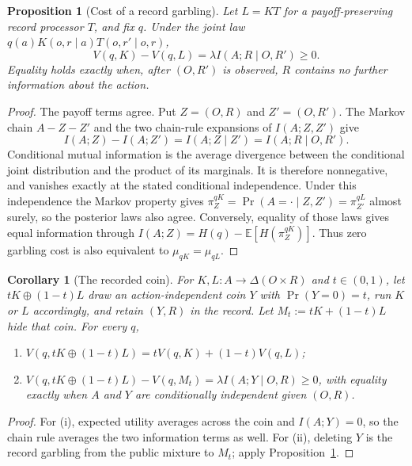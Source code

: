 \documentclass[11pt,a4paper]{article}
\newtheorem{proposition}[theorem]{Proposition}
\newtheorem{corollary}[theorem]{Corollary}
\theoremstyle{definition}
\newcommand{\D}{\Delta}
\newcommand{\E}{\mathbb E}
\newcommand{\Sh}{H}
\newcommand{\1}{\mathbf 1}
\begin{document}
\begin{proposition}[Cost of a record garbling]\label{prop:garbling-price}
Let $L=KT$ for a payoff-preserving record processor $T$, and fix $q$.
Under the joint law $q(a)K(o,r\mid a)T(o,r'\mid o,r)$,
\[
V(q,K)-V(q,L)=\lambda I(A;R\mid O,R')\ge0.
\]
Equality holds exactly when, after $(O,R')$ is observed, $R$ contains
no further information about the action.
\end{proposition}

\begin{proof}
The payoff terms agree.  Put $Z=(O,R)$ and $Z'=(O,R')$.
The Markov chain $A-Z-Z'$ and the two chain-rule expansions of
$I(A;Z,Z')$ give
\[
I(A;Z)-I(A;Z')=I(A;Z\mid Z')=I(A;R\mid O,R').
\]
Conditional mutual information is the average divergence between the
conditional joint distribution and the product of its marginals.  It is
therefore nonnegative, and vanishes exactly at the stated conditional
independence.  Under this independence the Markov property gives
$\pi^{qK}_Z=\Pr(A=\cdot\mid Z,Z')=\pi^{qL}_{Z'}$ almost surely,
so the posterior laws also agree.  Conversely, equality of those laws
gives equal information through
$I(A;Z)=\Sh(q)-\E[\Sh(\pi^{qK}_Z)]$.
Thus zero garbling cost is also equivalent to $\mu_{qK}=\mu_{qL}$.
\end{proof}

\begin{corollary}[The recorded coin]\label{cor:recorded-coin}
For $K,L:A\to\D(O\times R)$ and $t\in(0,1)$, let
$tK\oplus(1-t)L$ draw an action-independent coin $Y$ with
$\Pr(Y=0)=t$, run $K$ or $L$ accordingly, and retain $(Y,R)$ in the
record.  Let $M_t:=tK+(1-t)L$ hide that coin.  For every $q$,
\begin{enumerate}[label=\textup{(\roman*)},leftmargin=*]
\item $V(q,tK\oplus(1-t)L)=tV(q,K)+(1-t)V(q,L)$;
\item $V(q,tK\oplus(1-t)L)-V(q,M_t)=\lambda I(A;Y\mid O,R)\ge0$,
with equality exactly when $A$ and $Y$ are conditionally independent
given $(O,R)$.
\end{enumerate}
\end{corollary}

\begin{proof}
For \textup{(i)}, expected utility averages across the coin and
$I(A;Y)=0$, so the chain rule averages the two information terms as well.
For \textup{(ii)}, deleting $Y$ is the record garbling from the public
mixture to $M_t$; apply Proposition~\ref{prop:garbling-price}.
\end{proof}
\end{document}
